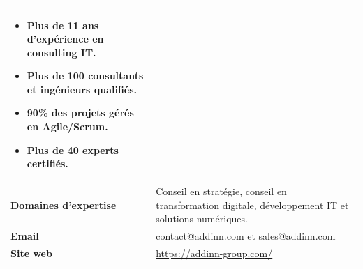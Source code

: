 \begin{table}[H]
\begin{tabular}{|p{2.3cm}|p{14cm}|}
\begin{minipage}{14cm}
                            \vspace{0.15cm} 
                            \begin{itemize}[left=-0.1cm,label=$\bullet$]
                                \item Plus de 11 ans d’expérience en consulting IT.  
                                \item Plus de 100 consultants et ingénieurs qualifiés.  
                                \item 90\% des projets gérés en Agile/Scrum.  
                                \item Plus de 40 experts certifiés.  
                            \end{itemize}
                        \end{minipage}\\
                \hline
                    \textbf{Domaines d'expertise} & Conseil en stratégie, conseil en transformation digitale, développement IT et solutions numériques. \\
                \hline 
                    \textbf{Email} & 
                        contact@addinn.com et sales@addinn.com \\
                \hline
                    \textbf{Site web} & \url{https://addinn-group.com/}\\
                \hline
            \end{tabular}
            \label{tab:infoADD}
        \end{table} 
    \vspace{-0.5cm}
